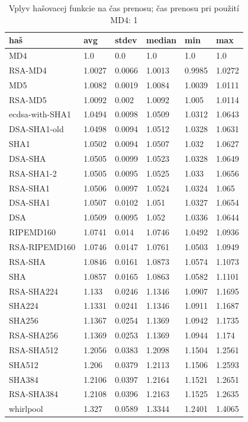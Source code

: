 \documentclass[12pt,a4paper]{article}
\begin{document}
\begin{table}\centering
    \caption{Vplyv hašovacej funkcie na čas prenosu; čas prenosu pri použití MD4: 1}
    \label{tbl:digest-comparison}
    \begin{tabular}{|l||l|l|l|l|l|}
        \hline
        \bf haš & \bf  avg & \bf stdev & \bf median & \bf min & \bf max \\ \hline 
        MD4 & 1.0 & 0.0 & 1.0 & 1.0 & 1.0 \\ \hline
        RSA-MD4 & 1.0027 & 0.0066 & 1.0013 & 0.9985 & 1.0272 \\ \hline
        MD5 & 1.0082 & 0.0019 & 1.0084 & 1.0039 & 1.0111 \\ \hline
        RSA-MD5 & 1.0092 & 0.002 & 1.0092 & 1.005 & 1.0114 \\ \hline
        ecdsa-with-SHA1 & 1.0494 & 0.0098 & 1.0509 & 1.0312 & 1.0643 \\ \hline
        DSA-SHA1-old & 1.0498 & 0.0094 & 1.0512 & 1.0328 & 1.0631 \\ \hline
        SHA1 & 1.0502 & 0.0094 & 1.0507 & 1.032 & 1.0627 \\ \hline
        DSA-SHA & 1.0505 & 0.0099 & 1.0523 & 1.0328 & 1.0649 \\ \hline
        RSA-SHA1-2 & 1.0505 & 0.0095 & 1.0525 & 1.033 & 1.0656 \\ \hline
        RSA-SHA1 & 1.0506 & 0.0097 & 1.0524 & 1.0324 & 1.065 \\ \hline
        DSA-SHA1 & 1.0507 & 0.0102 & 1.051 & 1.0327 & 1.0654 \\ \hline
        DSA & 1.0509 & 0.0095 & 1.052 & 1.0336 & 1.0644 \\ \hline
        RIPEMD160 & 1.0741 & 0.014 & 1.0746 & 1.0492 & 1.0936 \\ \hline
        RSA-RIPEMD160 & 1.0746 & 0.0147 & 1.0761 & 1.0503 & 1.0949 \\ \hline
        RSA-SHA & 1.0846 & 0.0161 & 1.0873 & 1.0574 & 1.1073 \\ \hline
        SHA & 1.0857 & 0.0165 & 1.0863 & 1.0582 & 1.1101 \\ \hline
        RSA-SHA224 & 1.133 & 0.0246 & 1.1346 & 1.0907 & 1.1695 \\ \hline
        SHA224 & 1.1331 & 0.0241 & 1.1346 & 1.0911 & 1.1687 \\ \hline
        SHA256 & 1.1367 & 0.0254 & 1.1369 & 1.0942 & 1.1735 \\ \hline
        RSA-SHA256 & 1.1369 & 0.0253 & 1.1369 & 1.0944 & 1.174 \\ \hline
        RSA-SHA512 & 1.2056 & 0.0383 & 1.2098 & 1.1504 & 1.2561 \\ \hline
        SHA512 & 1.206 & 0.0379 & 1.2113 & 1.1506 & 1.2593 \\ \hline
        SHA384 & 1.2106 & 0.0397 & 1.2164 & 1.1521 & 1.2651 \\ \hline
        RSA-SHA384 & 1.2108 & 0.0396 & 1.2163 & 1.1525 & 1.2635 \\ \hline
        whirlpool & 1.327 & 0.0589 & 1.3344 & 1.2401 & 1.4065 \\ \hline
    \end{tabular}
\end{table}
\end{document}
